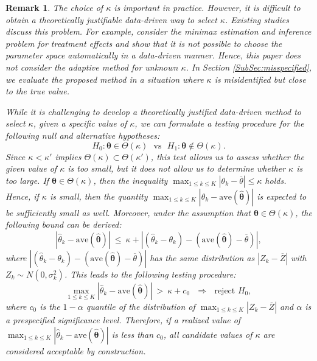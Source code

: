 \documentclass[12pt,a4paper]{article}
\newtheorem{Remark}{Remark}
\newcommand{\dk}[1]{{ \color{blue}[DK: #1]}}
\begin{document}
\begin{Remark}\label{rem:choice_kappa}
The choice of $\kappa$ is important in practice. However, it is difficult to obtain a theoretically justifiable data-driven way to select $\kappa$. Existing studies discuss this problem. For example, \cite{armstrong2018optimal,armstrong2021finite} consider the minimax estimation and inference problem for treatment effects and show that it is not possible to choose the parameter space automatically in a data-driven manner. Hence, this paper does not consider the adaptive method for unknown $\kappa$. In Section \ref{SubSec:misspecified}, we evaluate the proposed method in a situation where $\kappa$ is misidentified but close to the true value.

While it is challenging to develop a theoretically justified data-driven method to select $\kappa$, given a specific value of $\kappa$, we can formulate a testing procedure for the following null and alternative hypotheses:
\[
H_0: \bm{\theta} \in \Theta(\kappa) \ \ \ \text{vs} \ \ \ H_1: \bm{\theta} \not\in \Theta(\kappa).
\]
Since $\kappa < \kappa'$ implies $\Theta(\kappa) \subset \Theta(\kappa')$, this test allows us to assess whether the given value of $\kappa$ is too small, but it does not allow us to determine whether $\kappa$ is too large. If $\bm{\theta} \in \Theta(\kappa)$, then the inequality $\max_{1 \leq k \leq K} |\theta_k - \overline{\theta}| \leq \kappa$ holds. Hence, if $\kappa$ is small, then the quantity $\max_{1 \leq k \leq K} \left| \hat{\theta}_k - \mathrm{ave}(\hat{\bm{\theta}}) \right|$ is expected to be sufficiently small as well. Moreover, under the assumption that $\bm{\theta} \in \Theta(\kappa)$, the following bound can be derived:
$$
\left| \hat{\theta}_k - \mathrm{ave}(\hat{\bm{\theta}}) \right| \ \leq \ \kappa + \left| (\hat{\theta}_k-\theta_k) - (\mathrm{ave}(\hat{\bm{\theta}}) -\overline{\theta} )\right|,
$$
where $\left| (\hat{\theta}_k-\theta_k) - (\mathrm{ave}(\hat{\bm{\theta}}) -\overline{\theta} )\right|$ has the same distribution as $\left| Z_k - \overline{Z} \right|$ with $Z_k \sim N(0,\sigma_k^2)$. This leads to the following testing procedure:
\[
\max_{1 \leq k \leq K} \left| \hat{\theta}_k - \mathrm{ave}(\hat{\bm{\theta}}) \right| \ > \ \kappa + c_0 \ \ \ \Rightarrow \ \ \ \text{reject $H_0$},
\]
where $c_0$ is the $1-\alpha$ quantile of the distribution of $\max_{1 \leq k \leq K} \left| Z_k - \overline{Z} \right|$ and $\alpha$ is a prespecified significance level. Therefore, if a realized value of $\max_{1 \leq k \leq K} \left| \hat{\theta}_k - \mathrm{ave}(\hat{\bm{\theta}}) \right|$ is less than $c_0$, all candidate values of $\kappa$ are considered acceptable by construction.
\end{Remark}
\end{document}
